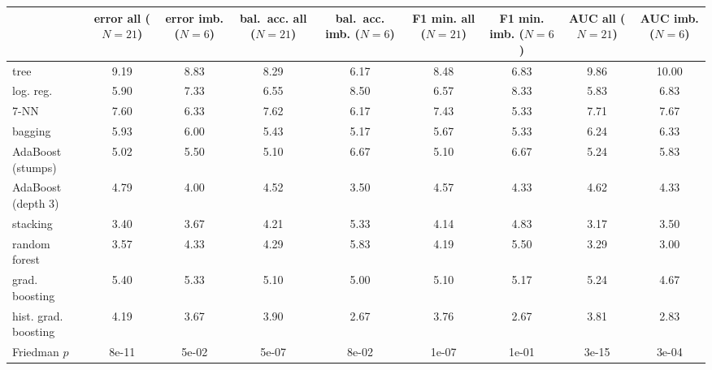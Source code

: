 \begin{tabular}{lcccccccc}
\toprule
 & \shortstack{error\\all ($N=21$)} & \shortstack{error\\imb. ($N=6$)} & \shortstack{bal.\ acc.\\all ($N=21$)} & \shortstack{bal.\ acc.\\imb. ($N=6$)} & \shortstack{F1 min.\\all ($N=21$)} & \shortstack{F1 min.\\imb. ($N=6$)} & \shortstack{AUC\\all ($N=21$)} & \shortstack{AUC\\imb. ($N=6$)} \\
\midrule
tree & 9.19 & 8.83 & 8.29 & 6.17 & 8.48 & 6.83 & 9.86 & 10.00 \\
log. reg. & 5.90 & 7.33 & 6.55 & 8.50 & 6.57 & 8.33 & 5.83 & 6.83 \\
7-NN & 7.60 & 6.33 & 7.62 & 6.17 & 7.43 & 5.33 & 7.71 & 7.67 \\
bagging & 5.93 & 6.00 & 5.43 & 5.17 & 5.67 & 5.33 & 6.24 & 6.33 \\
AdaBoost (stumps) & 5.02 & 5.50 & 5.10 & 6.67 & 5.10 & 6.67 & 5.24 & 5.83 \\
AdaBoost (depth 3) & 4.79 & 4.00 & 4.52 & 3.50 & 4.57 & 4.33 & 4.62 & 4.33 \\
stacking & 3.40 & 3.67 & 4.21 & 5.33 & 4.14 & 4.83 & 3.17 & 3.50 \\
random forest & 3.57 & 4.33 & 4.29 & 5.83 & 4.19 & 5.50 & 3.29 & 3.00 \\
grad. boosting & 5.40 & 5.33 & 5.10 & 5.00 & 5.10 & 5.17 & 5.24 & 4.67 \\
hist. grad. boosting & 4.19 & 3.67 & 3.90 & 2.67 & 3.76 & 2.67 & 3.81 & 2.83 \\
Friedman $p$ & 8e-11 & 5e-02 & 5e-07 & 8e-02 & 1e-07 & 1e-01 & 3e-15 & 3e-04 \\
\bottomrule
\end{tabular}
